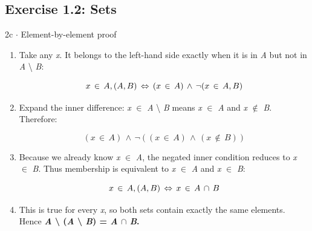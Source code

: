 \documentclass[11pt]{article}
\begin{document}
\begin{keepsection}\subsection{Exercise 1.2: Sets}

\begin{workedbox}{2c \ensuremath{\cdot} Element-by-element proof}
\begin{enumerate}
\item {}
Take any \textit{x}. It belongs to the left-hand side exactly when it is in \textit{A} but not in \textit{A} \textbackslash{} \textit{B}:

\begin{equation*}{x}\, \in \, {A}\, \\, ({A}\, \\, {B})\, \Leftrightarrow \, ({x}\, \in \, {A})\, \land \, \neg ({x}\, \in \, {A}\, \\, {B})\end{equation*}
\item {}
Expand the inner difference: \textit{x} \ensuremath{\in} \textit{A} \textbackslash{} \textit{B} means \textit{x} \ensuremath{\in} \textit{A} and \textit{x} \ensuremath{\notin} \textit{B}. Therefore:

\begin{equation*}({x}\, \in \, {A})\, \land \, \neg (({x}\, \in \, {A})\, \land \, ({x}\, \notin \, {B}))\end{equation*}
\item {}
Because we already know \textit{x} \ensuremath{\in} \textit{A}, the negated inner condition reduces to \textit{x} \ensuremath{\in} \textit{B}. Thus membership is equivalent to \textit{x} \ensuremath{\in} \textit{A} and \textit{x} \ensuremath{\in} \textit{B}:

\begin{equation*}{x}\, \in \, {A}\, \\, ({A}\, \\, {B})\, \Leftrightarrow \, {x}\, \in \, {A}\, \cap \, {B}\end{equation*}
\item This is true for every \textit{x}, so both sets contain exactly the same elements. Hence \textbf{\textit{A} \textbackslash{} (\textit{A} \textbackslash{} \textit{B}) = \textit{A} \ensuremath{\cap} \textit{B}.}
\end{enumerate}
\end{workedbox}

\end{keepsection}
\end{document}
